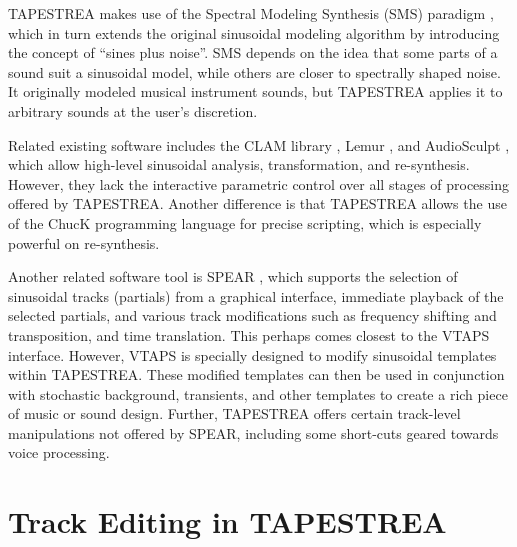 \documentclass{article}
\begin{document}
TAPESTREA makes use of the Spectral Modeling Synthesis (SMS) paradigm \cite{sms}, which 
in turn extends the original sinusoidal modeling algorithm \cite{mq} by introducing 
the concept of ``sines plus noise''. SMS depends on the idea that some parts of a sound suit 
a sinusoidal model, while others are closer to spectrally shaped noise. It  
originally modeled musical instrument sounds, but TAPES\-TREA applies it to arbitrary sounds 
at the user's discretion. 

Related existing software includes the CLAM library \cite{clam}, Lemur \cite{lemur}, and AudioSculpt \cite{audiosculpt}, which allow high-level sinusoidal analysis, transformation, and re-synthesis. 
However, they lack the interactive parametric control over all stages of processing offered by 
TAPESTREA. Another difference is that TAPESTREA allows the use of the ChucK \cite{chuck} 
programming language for precise scripting, which is especially powerful on re-synthesis. 

Another related software tool is SPEAR \cite{spear}, which supports the selection of sinusoidal 
tracks (partials) from a graphical interface, immediate playback of the selected partials, 
and various track modifications such as frequency shifting and transposition, and time 
translation. This perhaps comes closest to the VTAPS interface. However, VTAPS is specially 
designed to modify sinusoidal templates within TAPESTREA. These modified templates 
can then be used in conjunction with stochastic background, transients, and other templates 
to create a rich piece of music or sound design. Further, TAPESTREA offers certain track-level manipulations not offered by SPEAR, including some short-cuts geared towards voice processing. 

\section{Track Editing in TAPESTREA}
\end{document}
